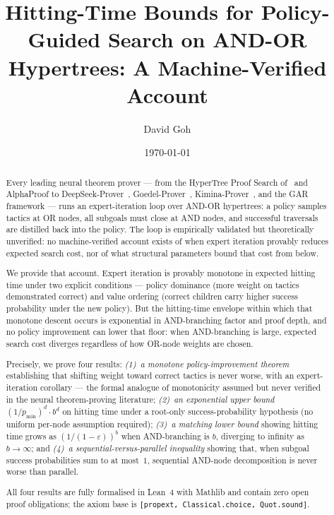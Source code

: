 \documentclass[reqno,11pt]{amsart}
\theoremstyle{plain}
\theoremstyle{definition}
\theoremstyle{remark}
\begin{document}
\title[Hitting-Time Bounds for AND-OR Hypertree Search]{Hitting-Time Bounds for Policy-Guided Search on AND-OR Hypertrees: A Machine-Verified Account}

\author{David Goh}

\date{\today}

\begin{abstract}
Every leading neural theorem prover --- from the HyperTree Proof Search of~\citet{Lample2022} and AlphaProof to DeepSeek-Prover~\citep{DeepSeekProver2024}, Goedel-Prover~\citep{GoedelProver2025}, Kimina-Prover~\citep{KiminaProver2025}, and the GAR framework --- runs an expert-iteration loop over AND-OR hypertrees: a policy samples tactics at OR nodes, all subgoals must close at AND nodes, and successful traversals are distilled back into the policy. The loop is empirically validated but theoretically unverified: no machine-verified account exists of when expert iteration provably reduces expected search cost, nor of what structural parameters bound that cost from below.

We provide that account. Expert iteration is provably monotone in expected hitting time under two explicit conditions --- policy dominance (more weight on tactics demonstrated correct) and value ordering (correct children carry higher success probability under the new policy). But the hitting-time envelope within which that monotone descent occurs is exponential in AND-branching factor and proof depth, and no policy improvement can lower that floor: when AND-branching is large, expected search cost diverges regardless of how OR-node weights are chosen.

Precisely, we prove four results: \emph{(1)~a monotone policy-improvement theorem} establishing that shifting weight toward correct tactics is never worse, with an expert-iteration corollary --- the formal analogue of monotonicity assumed but never verified in the neural theorem-proving literature; \emph{(2)~an exponential upper bound} $(1/p_{\min})^d \cdot b^d$ on hitting time under a root-only success-probability hypothesis (no uniform per-node assumption required); \emph{(3)~a matching lower bound} showing hitting time grows as $(1/(1-\varepsilon))^b$ when AND-branching is $b$, diverging to infinity as $b\to\infty$; and \emph{(4)~a sequential-versus-parallel inequality} showing that, when subgoal success probabilities sum to at most~$1$, sequential AND-node decomposition is never worse than parallel.

All four results are fully formalised in Lean~4 with Mathlib and contain zero open proof obligations; the axiom base is \texttt{[propext, Classical.choice, Quot.sound]}.
\end{abstract}
\end{document}
